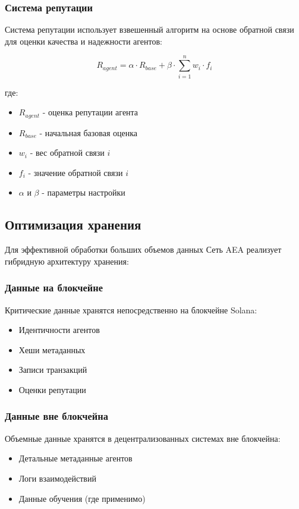 \documentclass[12pt,a4paper]{article}
\begin{document}
\subsubsection{Система репутации}

Система репутации использует взвешенный алгоритм на основе обратной связи для оценки качества и надежности агентов:

\begin{equation}
R_{agent} = \alpha \cdot R_{base} + \beta \cdot \sum_{i=1}^{n} w_i \cdot f_i
\end{equation}

где:
\begin{itemize}
\item $R_{agent}$ - оценка репутации агента
\item $R_{base}$ - начальная базовая оценка
\item $w_i$ - вес обратной связи $i$
\item $f_i$ - значение обратной связи $i$
\item $\alpha$ и $\beta$ - параметры настройки
\end{itemize}

\subsection{Оптимизация хранения}

Для эффективной обработки больших объемов данных Сеть AEA реализует гибридную архитектуру хранения:

\subsubsection{Данные на блокчейне}

Критические данные хранятся непосредственно на блокчейне Solana:
\begin{itemize}
\item Идентичности агентов
\item Хеши метаданных
\item Записи транзакций
\item Оценки репутации
\end{itemize}

\subsubsection{Данные вне блокчейна}

Объемные данные хранятся в децентрализованных системах вне блокчейна:
\begin{itemize}
\item Детальные метаданные агентов
\item Логи взаимодействий
\item Данные обучения (где применимо)
\end{itemize}
\end{document}
